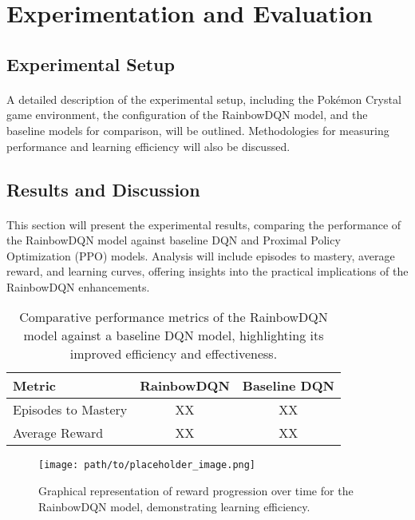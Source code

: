 \documentclass[12pt,a4paper]{article}
\begin{document}
\section{Experimentation and Evaluation}
\subsection{Experimental Setup}
\paragraph{}
A detailed description of the experimental setup, including the Pokémon Crystal game environment, the configuration of the RainbowDQN model, and the baseline models for comparison, will be outlined. Methodologies for measuring performance and learning efficiency will also be discussed.

\subsection{Results and Discussion}
\paragraph{}
This section will present the experimental results, comparing the performance of the RainbowDQN model against baseline DQN and Proximal Policy Optimization (PPO) models. Analysis will include episodes to mastery, average reward, and learning curves, offering insights into the practical implications of the RainbowDQN enhancements.

\begin{table}[ht]
\centering
\begin{tabular}{@{}lcc@{}}
\toprule
Metric & RainbowDQN & Baseline DQN \\ \midrule
Episodes to Mastery & XX & XX \\
Average Reward & XX & XX \\
\bottomrule
\end{tabular}
\caption{Comparative performance metrics of the RainbowDQN model against a baseline DQN model, highlighting its improved efficiency and effectiveness.}
\label{tab:performance_metrics}
\end{table}

\begin{figure}[ht]
\centering
\texttt{[image: path/to/placeholder\_image.png]}
\caption{Graphical representation of reward progression over time for the RainbowDQN model, demonstrating learning efficiency.}
\label{fig:reward_over_time}
\end{figure}
\end{document}
